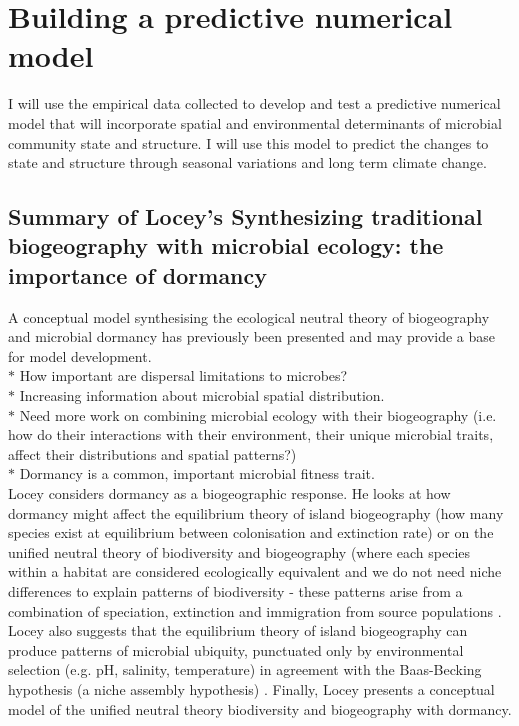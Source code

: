 \section{Building a predictive numerical model}

\noindent I will use the empirical data collected to develop and test a predictive numerical model that will incorporate spatial and environmental determinants of microbial community state and structure. I will use this model to predict the changes to state and structure through seasonal variations and long term climate change. 


\subsection{Summary of Locey's Synthesizing traditional biogeography with microbial ecology: the importance of dormancy \cite{locey2010synthesizing}}

\noindent A conceptual model synthesising the ecological neutral theory of biogeography and microbial dormancy has previously been presented \cite{locey2010synthesizing} and may provide a base for model development.\\
{$\ast$ How important are dispersal limitations to microbes?}\\
{$\ast$ Increasing information about microbial spatial distribution.}\\
{$\ast$ Need more work on combining microbial ecology with their biogeography (i.e. how do their interactions with their environment, their unique microbial traits, affect their distributions and spatial patterns?)}\\
{$\ast$ Dormancy is a common, important microbial fitness trait.}\\

\noindent Locey considers dormancy as a biogeographic response. He looks at how dormancy might affect the equilibrium theory of island biogeography (how many species exist at equilibrium between colonisation and extinction rate) or on the unified neutral theory of biodiversity and biogeography (where each species within a habitat are considered ecologically equivalent and we do not need niche differences to explain patterns of biodiversity - these patterns arise from a combination of speciation, extinction and immigration from source populations \cite{harpole2010neutral}. \\

\noindent Locey also suggests that the equilibrium theory of island biogeography can produce patterns of microbial ubiquity, punctuated only by environmental selection (e.g. pH, salinity, temperature) in agreement with the Baas-Becking hypothesis (a niche assembly hypothesis) \cite{baas1934geobiologie}. Finally, Locey presents a conceptual model of the unified neutral theory biodiversity and biogeography with dormancy.\\

